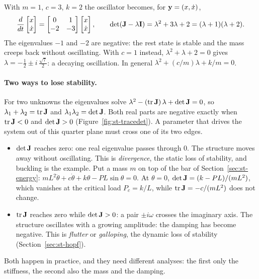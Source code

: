 \begin{example}\label{ex:st-osc-eig}
With $m = 1$, $c = 3$, $k = 2$ the oscillator becomes, for $\mathbf{y} = (x,\dot x)$,
\[
  \frac{d}{dt}\begin{bmatrix} x\\ \dot x\end{bmatrix}
  = \begin{bmatrix} 0 & 1\\ -2 & -3\end{bmatrix}
    \begin{bmatrix} x\\ \dot x\end{bmatrix},
  \qquad
  \det(\mathbf{J} - \lambda\mathbf{I}) = \lambda^2 + 3\lambda + 2 = (\lambda+1)(\lambda+2).
\]
The eigenvalues $-1$ and $-2$ are negative: the rest state is stable and the mass
creeps back without oscillating. With $c = 1$ instead, $\lambda^2 + \lambda + 2 = 0$
gives $\lambda = -\tfrac12 \pm i\,\tfrac{\sqrt7}{2}$: a decaying oscillation.
In general $\lambda^2 + (c/m)\lambda + k/m = 0$.
\end{example}

\paragraph{Two ways to lose stability.}
%
For two unknowns the eigenvalues solve
$\lambda^2 - (\operatorname{tr}\mathbf{J})\,\lambda + \det\mathbf{J} = 0$, so
$\lambda_1 + \lambda_2 = \operatorname{tr}\mathbf{J}$ and $\lambda_1\lambda_2 = \det\mathbf{J}$. Both
real parts are negative exactly when $\operatorname{tr}\mathbf{J} < 0$ and $\det\mathbf{J} > 0$
(Figure~\ref{fig:st-tracedet}). A parameter that drives the system out of this
quarter plane must cross one of its two edges.
\begin{itemize}
  \item $\det\mathbf{J}$ reaches zero: one real eigenvalue passes through $0$. The
        structure moves away without oscillating. This is \emph{divergence}, the
        static loss of stability, and buckling is the example. Put a mass $m$ on top
        of the bar of Section~\ref{sec:st-energy}:
        $mL^2\ddot\theta + c\dot\theta + k\theta - PL\sin\theta = 0$. At $\theta = 0$,
        $\det\mathbf{J} = (k - PL)/(mL^2)$, which vanishes at the critical load
        $P_c = k/L$, while $\operatorname{tr}\mathbf{J} = -c/(mL^2)$ does not change.
  \item $\operatorname{tr}\mathbf{J}$ reaches zero while $\det\mathbf{J} > 0$: a pair $\pm i\omega$
        crosses the imaginary axis. The structure oscillates with a growing
        amplitude: the damping has become negative. This is \emph{flutter} or
        \emph{galloping}, the dynamic loss of stability (Section~\ref{sec:st-hopf}).
\end{itemize}
Both happen in practice, and they need different analyses: the first only the
stiffness, the second also the mass and the damping.

